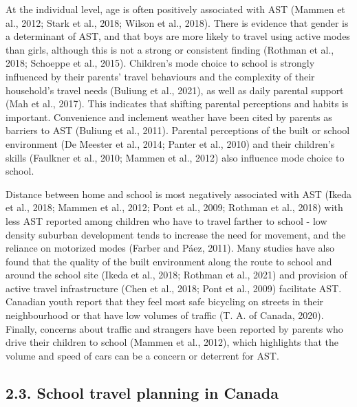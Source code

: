 \documentclass[]{elsarticle} %
\begin{document}
At the individual level, age is often positively associated with AST
(Mammen et al., 2012; Stark et al., 2018; Wilson et al., 2018). There is
evidence that gender is a determinant of AST, and that boys are more
likely to travel using active modes than girls, although this is not a
strong or consistent finding (Rothman et al., 2018; Schoeppe et al.,
2015). Children's mode choice to school is strongly influenced by their
parents' travel behaviours and the complexity of their household's
travel needs (Buliung et al., 2021), as well as daily parental support
(Mah et al., 2017). This indicates that shifting parental perceptions
and habits is important. Convenience and inclement weather have been
cited by parents as barriers to AST (Buliung et al., 2011). Parental
perceptions of the built or school environment (De Meester et al., 2014;
Panter et al., 2010) and their children's skills (Faulkner et al., 2010;
Mammen et al., 2012) also influence mode choice to school.

Distance between home and school is most negatively associated with AST
(Ikeda et al., 2018; Mammen et al., 2012; Pont et al., 2009; Rothman et
al., 2018) with less AST reported among children who have to travel
farther to school - low density suburban development tends to increase
the need for movement, and the reliance on motorized modes (Farber and
Páez, 2011). Many studies have also found that the quality of the built
environment along the route to school and around the school site (Ikeda
et al., 2018; Rothman et al., 2021) and provision of active travel
infrastructure (Chen et al., 2018; Pont et al., 2009) facilitate AST.
Canadian youth report that they feel most safe bicycling on streets in
their neighbourhood or that have low volumes of traffic (T. A. of
Canada, 2020). Finally, concerns about traffic and strangers have been
reported by parents who drive their children to school (Mammen et al.,
2012), which highlights that the volume and speed of cars can be a
concern or deterrent for AST.

\hypertarget{school-travel-planning-in-canada}{%
\subsection{2.3. School travel planning in
Canada}\label{school-travel-planning-in-canada}}
\end{document}
